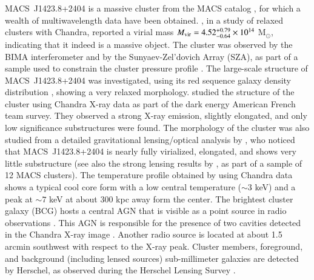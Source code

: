 \documentclass[traditabstract]{aa}
\begin{document}
\mbox{MACS~J1423.8+2404} is a massive cluster from the MACS catalog \citep[Massive Cluster Survey;][]{ebeling2001}, for which a wealth of multiwavelength data have been obtained. \cite{schmidt2007}, in a study of relaxed clusters with Chandra, reported a virial mass $M_{\rm vir} = 4.52^{+0.79}_{-0.64} \times 10^{14}$ M$_{\odot}$, indicating that it indeed  is a massive object. The cluster was observed by the BIMA interferometer \citep{laroque2003} and by the Sunyaev-Zel'dovich Array (SZA), as part of a sample used to constrain the cluster pressure profile \citep{bonamente2012}. The large-scale structure of \mbox{MACS~J1423.8+2404} was investigated, using its red sequence galaxy density distribution \citep{kartaltepe2008}, showing a very relaxed morphology. \cite{guennou2014} studied the structure of the cluster using Chandra X-ray data as part of the dark energy American French team survey. They observed a strong X-ray emission, slightly elongated, and only low significance substructures were found. The morphology of the cluster was also studied from a detailed gravitational lensing/optical analysis by \cite{limousin2010}, who noticed that \mbox{MACS~J1423.8+2404} is nearly fully virialized, elongated, and shows very little substructure (see also the strong lensing results by \cite{zitrin2011}, as part of a sample of 12 MACS clusters). The temperature profile obtained by \cite{morandi2010} using Chandra data shows a typical cool core form with a low central temperature ($\sim 3$ keV) and a peak at $\sim 7$ keV at about 300 kpc away form the center. The brightest cluster galaxy (BCG) hosts a central AGN that is visible as a point source in radio observations \citep{condon1998,laroque2003,coble2007,bonamente2012}. This AGN is responsible for the presence of two cavities detected in the Chandra X-ray image \citep{hlavacek_larrondo2012}. Another radio source is located at about 1.5 arcmin southwest with respect to the X-ray peak. Cluster members, foreground, and background (including lensed sources) sub-millimeter galaxies are detected by Herschel, as observed during the Herschel Lensing Survey \citep[HLS;][]{egami2010,rawle2012}.
\end{document}
